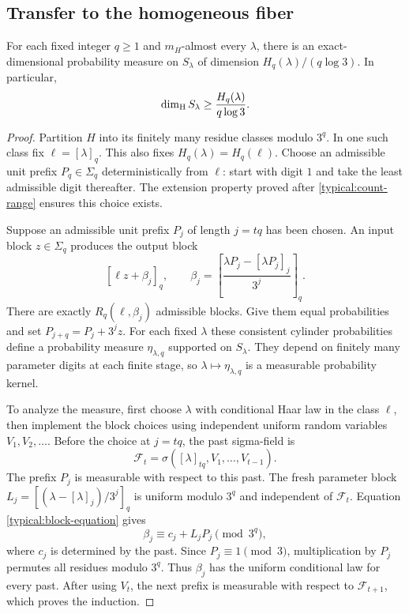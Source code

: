 \subsection{Transfer to the homogeneous fiber}

\begin{lemma}
\label{typical:block-measure}
For each fixed integer $q\ge1$ and $m_H$-almost every $\lambda$,
there is an exact-dimensional probability measure on $S_\lambda$
of dimension $H_q(\lambda)/(q\log3)$. In particular,
\begin{equation}\label{typical:block-lower}
 \dim_{\mathrm H} S_\lambda\ge \frac{H_q(\lambda)}{q\log3}.
\end{equation}
\end{lemma}

\begin{proof}
Partition $H$ into its finitely many residue classes modulo $3^q$.
In one such class fix $\ell=[\lambda]_q$. This also fixes
$H_q(\lambda)=H_q(\ell)$. Choose an admissible unit prefix
$P_q\in\Sigma_q$ deterministically from $\ell$: start with digit $1$
and take the least admissible digit thereafter. The extension property
proved after \eqref{typical:count-range} ensures this choice exists.

Suppose an admissible unit prefix $P_j$ of length $j=tq$ has been
chosen. An input block $z\in\Sigma_q$ produces the output block
\begin{equation}\label{typical:block-equation}
 [\ell z+\beta_j]_q,
 \qquad
 \beta_j=\left[\frac{\lambda P_j-[\lambda P_j]_j}{3^j}\right]_q.
\end{equation}
There are exactly $R_q(\ell,\beta_j)$ admissible blocks. Give them
equal probabilities and set $P_{j+q}=P_j+3^jz$. For each fixed
$\lambda$ these consistent cylinder probabilities define a
probability measure $\eta_{\lambda,q}$ supported on $S_\lambda$.
They depend on finitely many parameter digits at each finite stage,
so $\lambda\mapsto\eta_{\lambda,q}$ is a measurable probability kernel.

To analyze the measure, first choose $\lambda$ with conditional Haar
law in the class $\ell$, then implement the block choices using
independent uniform random variables $V_1,V_2,\ldots$. Before the
choice at $j=tq$, the past sigma-field is
\[
 \mathcal F_t=\sigma([\lambda]_{tq},V_1,\ldots,V_{t-1}).
\]
The prefix $P_j$ is measurable with respect to this past. The fresh
parameter block $L_j=[(\lambda-[\lambda]_j)/3^j]_q$ is uniform modulo
$3^q$ and independent of $\mathcal F_t$. Equation
\eqref{typical:block-equation} gives
\begin{equation}\label{typical:fresh-shift}
 \beta_j\equiv c_j+L_jP_j\pmod{3^q},
\end{equation}
where $c_j$ is determined by the past. Since $P_j\equiv1\pmod3$,
multiplication by $P_j$ permutes all residues modulo $3^q$.
Thus $\beta_j$ has the uniform conditional law for every past.
After using $V_t$, the next prefix is measurable with respect to
$\mathcal F_{t+1}$, which proves the induction.


\end{proof}
